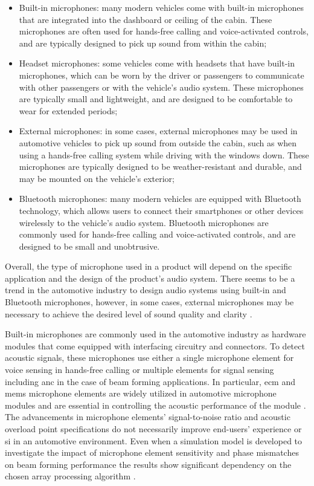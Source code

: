 \begin{itemize}
    \item Built-in microphones: many modern vehicles come with built-in microphones that are integrated into the dashboard or ceiling of the cabin. These microphones are often used for hands-free calling and voice-activated controls, and are typically designed to pick up sound from within the cabin;
    \item Headset microphones: some vehicles come with headsets that have built-in microphones, which can be worn by the driver or passengers to communicate with other passengers or with the vehicle's audio system. These microphones are typically small and lightweight, and are designed to be comfortable to wear for extended periods;
    \item External microphones: in some cases, external microphones may be used in automotive vehicles to pick up sound from outside the cabin, such as when using a hands-free calling system while driving with the windows down. These microphones are typically designed to be weather-resistant and durable, and may be mounted on the vehicle's exterior;
    \item Bluetooth microphones: many modern vehicles are equipped with Bluetooth technology, which allows users to connect their smartphones or other devices wirelessly to the vehicle's audio system. Bluetooth microphones are commonly used for hands-free calling and voice-activated controls, and are designed to be small and unobtrusive.
\end{itemize}

Overall, the type of microphone used in a product will depend on the specific application and the design of the product's audio system. There seems to be a trend in the automotive industry to design audio systems using built-in and Bluetooth microphones, however, in some cases, external microphones may be necessary to achieve the desired level of sound quality and clarity \cite{Rayburn2004}.

Built-in microphones are commonly used in the automotive industry as hardware modules that come equipped with interfacing circuitry and connectors. To detect acoustic signals, these microphones use either a single microphone element for voice sensing in hands-free calling or multiple elements for signal sensing including \gls{anc} in the case of beam forming applications. In particular, \gls{ecm} and \gls{mems} microphone elements are widely utilized in automotive microphone modules and are essential in controlling the acoustic performance of the module \cite{Aubauer2001}. The advancements in microphone elements' signal-to-noise ratio and acoustic overload point specifications do not necessarily improve end-users' experience or \gls{si} in an automotive environment. Even when a simulation model is developed to investigate the impact of microphone element sensitivity and phase mismatches on beam forming performance the results show significant dependency on the chosen array processing algorithm \cite{Du2019}. 

